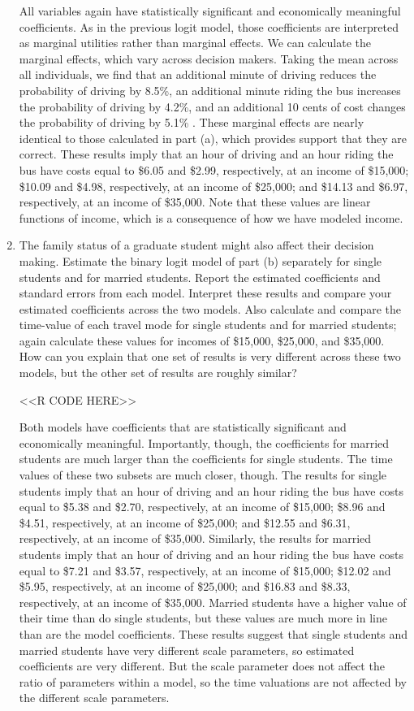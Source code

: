 \documentclass[11pt,letterpaper]{article}
\begin{document}
\begin{enumerate}[label=\alph*., leftmargin=*]
	All variables again have statistically significant and economically meaningful coefficients. As in the previous logit model, those coefficients are interpreted as marginal utilities rather than marginal effects. We can calculate the marginal effects, which vary across decision makers. Taking the mean across all individuals, we find that an additional minute of driving reduces the probability of driving by 8.5\%, an additional minute riding the bus increases the probability of driving by 4.2\%, and an additional 10 cents of cost changes the probability of driving by 5.1\% . These marginal effects are nearly identical to those calculated in part (a), which provides support that they are correct. These results imply that an hour of driving and an hour riding the bus have costs equal to \$6.05 and \$2.99, respectively, at an income of \$15,000; \$10.09 and \$4.98, respectively, at an income of \$25,000; and \$14.13 and \$6.97, respectively, at an income of \$35,000. Note that these values are linear functions of income, which is a consequence of how we have modeled income.
	
	\item The family status of a graduate student might also affect their decision making. Estimate the binary logit model of part (b) separately for single students and for married students. Report the estimated coefficients and standard errors from each model. Interpret these results and compare your estimated coefficients across the two models. Also calculate and compare the time-value of each travel mode for single students and for married students; again calculate these values for incomes of \$15,000, \$25,000, and \$35,000. How can you explain that one set of results is very different across these two models, but the other set of results are roughly similar?

	<<R CODE HERE>>

	Both models have coefficients that are statistically significant and economically meaningful. Importantly, though, the coefficients for married students are much larger than the coefficients for single students. The time values of these two subsets are much closer, though. The results for single students imply that an hour of driving and an hour riding the bus have costs equal to \$5.38 and \$2.70, respectively, at an income of \$15,000; \$8.96 and \$4.51, respectively, at an income of \$25,000; and \$12.55 and \$6.31, respectively, at an income of \$35,000. Similarly, the results for married students imply that an hour of driving and an hour riding the bus have costs equal to \$7.21 and \$3.57, respectively, at an income of \$15,000; \$12.02 and \$5.95, respectively, at an income of \$25,000; and \$16.83 and \$8.33, respectively, at an income of \$35,000. Married students have a higher value of their time than do single students, but these values are much more in line than are the model coefficients. These results suggest that single students and married students have very different scale parameters, so estimated coefficients are very different. But the scale parameter does not affect the ratio of parameters within a model, so the time valuations are not affected by the different scale parameters.
	

\end{enumerate}
\end{document}
